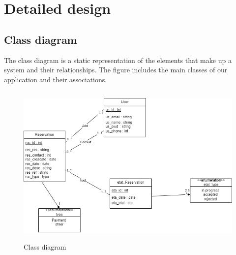 \section{Detailed design   }
\subsection{Class diagram  }

The class diagram is a static representation of the elements that make up a system and their relationships. The figure includes the main classes of our application and their associations. 

\begin{figure}[H]
   \centering
    \includegraphics[width=15cm,height=8cm]{images/class.drawio.png}
    \caption{Class diagram} 
    \label{class diagram}
\end{figure}

